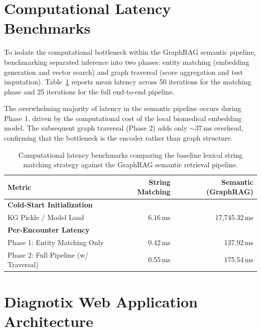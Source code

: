 \section{Computational Latency Benchmarks}
\label{app:latency_benchmarks}

To isolate the computational bottleneck within the GraphRAG semantic pipeline,
benchmarking separated inference into two phases: entity matching (embedding
generation and vector search) and graph traversal (score aggregation and test
imputation). Table~\ref{tab:latency_benchmarks} reports mean latency across 50
iterations for the matching phase and 25 iterations for the full end-to-end
pipeline.

The overwhelming majority of latency in the semantic pipeline occurs during
Phase 1, driven by the computational cost of the local biomedical embedding
model. The subsequent graph traversal (Phase 2) adds only ${\sim}37$\,ms
overhead, confirming that the bottleneck is the encoder rather than graph
structure.

\begin{table}[htbp]
    \centering
    \caption{Computational latency benchmarks comparing the baseline lexical
    string matching strategy against the GraphRAG semantic retrieval pipeline.}
    \label{tab:latency_benchmarks}
    \small
    \begin{tabular}{lrr}
        \toprule
        \textbf{Metric} & \textbf{String Matching} & \textbf{Semantic (GraphRAG)} \\
        \midrule
        \textbf{Cold-Start Initialization} & & \\
        \hspace{3mm} KG Pickle / Model Load & 6.16\,ms & 17{,}745.32\,ms \\
        \addlinespace
        \textbf{Per-Encounter Latency} & & \\
        \hspace{3mm} Phase 1: Entity Matching Only & 0.42\,ms & 137.92\,ms \\
        \hspace{3mm} Phase 2: Full Pipeline (w/ Traversal) & 0.55\,ms & 175.54\,ms \\
        \bottomrule
    \end{tabular}
\end{table}

\newpage
\section{Diagnotix Web Application Architecture}
\label{app:diagnotix}

